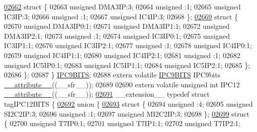 \begin{DoxyCode}
\hypertarget{a00009_source_l02662}{}\hyperlink{a00009}{02662}     \textcolor{keyword}{struct }\{
02663       \textcolor{keywordtype}{unsigned} DMA3IP:3;
02664       \textcolor{keywordtype}{unsigned} :1;
02665       \textcolor{keywordtype}{unsigned} IC3IP:3;
02666       \textcolor{keywordtype}{unsigned} :1;
02667       \textcolor{keywordtype}{unsigned} IC4IP:3;
02668     \};
\hypertarget{a00009_source_l02669}{}\hyperlink{a00009}{02669}     \textcolor{keyword}{struct }\{
02670       \textcolor{keywordtype}{unsigned} DMA3IP0:1;
02671       \textcolor{keywordtype}{unsigned} DMA3IP1:1;
02672       \textcolor{keywordtype}{unsigned} DMA3IP2:1;
02673       \textcolor{keywordtype}{unsigned} :1;
02674       \textcolor{keywordtype}{unsigned} IC3IP0:1;
02675       \textcolor{keywordtype}{unsigned} IC3IP1:1;
02676       \textcolor{keywordtype}{unsigned} IC3IP2:1;
02677       \textcolor{keywordtype}{unsigned} :1;
02678       \textcolor{keywordtype}{unsigned} IC4IP0:1;
02679       \textcolor{keywordtype}{unsigned} IC4IP1:1;
02680       \textcolor{keywordtype}{unsigned} IC4IP2:1;
02681       \textcolor{keywordtype}{unsigned} :1;
02682       \textcolor{keywordtype}{unsigned} IC5IP0:1;
02683       \textcolor{keywordtype}{unsigned} IC5IP1:1;
02684       \textcolor{keywordtype}{unsigned} IC5IP2:1;
02685     \};
02686   \};
02687 \} \hyperlink{a00008_d0/dc2/a00564}{IPC9BITS};
02688 \textcolor{keyword}{extern} \textcolor{keyword}{volatile} \hyperlink{a00008_d0/dc2/a00564}{IPC9BITS} IPC9bits \hyperlink{a00009_a493c46f03454991ccc5aa7a6e1dfb2a7}{\_\_attribute\_\_}((\_\_sfr\_\_));
02689 
02690 \textcolor{keyword}{extern} \textcolor{keyword}{volatile} \textcolor{keywordtype}{unsigned} \textcolor{keywordtype}{int}  IPC12 \hyperlink{a00009_a493c46f03454991ccc5aa7a6e1dfb2a7}{\_\_attribute\_\_}((\_\_sfr\_\_));
\hypertarget{a00009_source_l02691}{}\hyperlink{a00008}{02691} \_\_extension\_\_ \textcolor{keyword}{typedef} \textcolor{keyword}{struct }tagIPC12BITS \{
\hypertarget{a00009_source_l02692}{}\hyperlink{a00009}{02692}   \textcolor{keyword}{union }\{
\hypertarget{a00009_source_l02693}{}\hyperlink{a00009}{02693}     \textcolor{keyword}{struct }\{
02694       \textcolor{keywordtype}{unsigned} :4;
02695       \textcolor{keywordtype}{unsigned} SI2C2IP:3;
02696       \textcolor{keywordtype}{unsigned} :1;
02697       \textcolor{keywordtype}{unsigned} MI2C2IP:3;
02698     \};
\hypertarget{a00009_source_l02699}{}\hyperlink{a00009}{02699}     \textcolor{keyword}{struct }\{
02700       \textcolor{keywordtype}{unsigned} T7IP0:1;
02701       \textcolor{keywordtype}{unsigned} T7IP1:1;
02702       \textcolor{keywordtype}{unsigned} T7IP2:1;

\end{DoxyCode}
